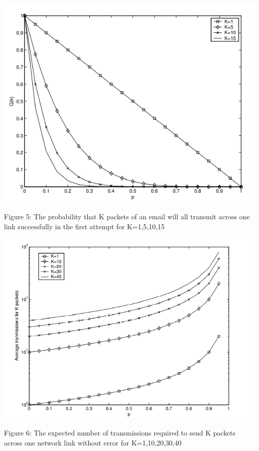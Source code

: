 \documentclass[10pt,twocolumn,letterpaper]{article}
\begin{document}
\includegraphics[width=\linewidth]{plots/fig5.PNG}
\caption{Figure 5: The probability that K packets of an email will all transmit across one link successfully in the first attempt for K=1,5,10,15}

\includegraphics[width=\linewidth]{plots/fig6.PNG}
\caption{Figure 6: The expected number of transmissions required to send K packets across one network link without error for K=1,10,20,30,40}
\end{document}
